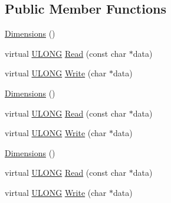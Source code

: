 \subsection*{Public Member Functions}
\begin{DoxyCompactItemize}
\item 
\hyperlink{struct_y_excel_1_1_worksheet_1_1_dimensions_a13890fe06f123992f3c7c546127e69d9}{Dimensions} ()
\item 
virtual \hyperlink{_basic_excel_8hpp_abe09d1bea023be6a07cbadde8e955435}{U\+L\+O\+N\+G} \hyperlink{struct_y_excel_1_1_worksheet_1_1_dimensions_abdbed657f807b59d4c26ac5829a425ce}{Read} (const char $\ast$data)
\item 
virtual \hyperlink{_basic_excel_8hpp_abe09d1bea023be6a07cbadde8e955435}{U\+L\+O\+N\+G} \hyperlink{struct_y_excel_1_1_worksheet_1_1_dimensions_a4c1fd817f8dbc389a48562039194ad47}{Write} (char $\ast$data)
\item 
\hyperlink{struct_y_excel_1_1_worksheet_1_1_dimensions_a13890fe06f123992f3c7c546127e69d9}{Dimensions} ()
\item 
virtual \hyperlink{_basic_excel_8hpp_abe09d1bea023be6a07cbadde8e955435}{U\+L\+O\+N\+G} \hyperlink{struct_y_excel_1_1_worksheet_1_1_dimensions_ac0e0ea012e3d456f4071324016a614d8}{Read} (const char $\ast$data)
\item 
virtual \hyperlink{_basic_excel_8hpp_abe09d1bea023be6a07cbadde8e955435}{U\+L\+O\+N\+G} \hyperlink{struct_y_excel_1_1_worksheet_1_1_dimensions_a2811bb3bd20dbfa6242861e527dc9a97}{Write} (char $\ast$data)
\item 
\hyperlink{struct_y_excel_1_1_worksheet_1_1_dimensions_a13890fe06f123992f3c7c546127e69d9}{Dimensions} ()
\item 
virtual \hyperlink{_basic_excel_8hpp_abe09d1bea023be6a07cbadde8e955435}{U\+L\+O\+N\+G} \hyperlink{struct_y_excel_1_1_worksheet_1_1_dimensions_ac0e0ea012e3d456f4071324016a614d8}{Read} (const char $\ast$data)
\item 
virtual \hyperlink{_basic_excel_8hpp_abe09d1bea023be6a07cbadde8e955435}{U\+L\+O\+N\+G} \hyperlink{struct_y_excel_1_1_worksheet_1_1_dimensions_a2811bb3bd20dbfa6242861e527dc9a97}{Write} (char $\ast$data)
\end{DoxyCompactItemize}
